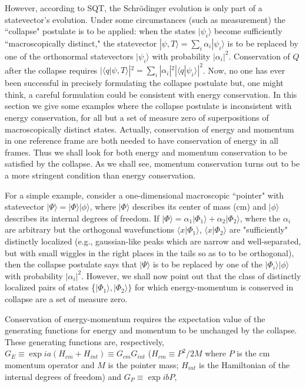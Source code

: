 \documentclass{article}
\begin{document}
	However, according to SQT, the Schr\"odinger evolution is only part of a statevector's evolution.  
Under some circumstances (such as measurement) the ``collapse" postulate is to be applied: when
the states $|\psi_{i}\rangle$ become sufficiently ``macroscopically distinct," 
the statevector $|\psi,T\rangle=\sum_{i}\alpha_{i}|\psi_{i}\rangle$ is to be 
replaced by one of the orthonormal statevectors $|\psi_{i}\rangle$ with probability $|\alpha_{i}|^{2}$. 
Conservation of $Q$ after the collapse requires 
$|\langle q|\psi,T\rangle|^{2}=\sum_{i}|\alpha_{i}|^{2}|\langle q|\psi_{i}\rangle|^{2}$.  
Now, no one has ever been successful
 in precisely formulating the collapse postulate but, one 
might think, a careful formulation could be consistent with energy conservation.  In this section 
we give some examples where the collapse postulate is inconsistent with energy conservation, for all but a 
set of measure zero of superpositions of macroscopically distinct states. 
Actually, conservation of energy and momentum in one reference frame are both needed to have conservation 
of energy in all frames. Thus we shall look for both energy and momentum conservation 
to be satisfied by the collapse.  As we shall see, momentum conservation turns out to be 
a more stringent condition than energy conservation.  

	For a simple example, consider a 
one-dimensional macroscopic ``pointer" with statevector $|\Psi\rangle=|\Phi\rangle|\phi\rangle$, where 
$|\Phi\rangle$ describes its center of mass (cm) and $|\phi\rangle$ describes its internal degrees of freedom.
If $|\Phi\rangle=\alpha_{1}|\Phi_{1}\rangle +\alpha_{2}|\Phi_{2}\rangle$, where the $\alpha_{i}$ are arbitrary 
but the orthogonal wavefunctions $\langle x |\Phi_{1}\rangle$, $\langle x |\Phi_{2}\rangle$ are "sufficiently" 
distinctly localized (e.g., gaussian-like peaks which are narrow and well-separated, 
but with small wiggles in the right places in the tails so as to to be orthogonal), then the collapse postulate says that 
$|\Psi\rangle$ is to be replaced by one of the $|\Phi_{i}\rangle|\phi\rangle$ with probability $|\alpha_{i}|^{2}$. 
However, we shall now point out that the class of distinctly localized pairs of states 
\{$|\Phi_{1}\rangle,|\Phi_{2}\rangle \}$ 
for which energy-momentum is conserved in collapse are a set of measure zero.  

	  Conservation of energy-momentum requires 
the expectation value of the generating functions for energy and momentum to be unchanged by the collapse.
These generating functions are, respectively, $G_{E}\equiv\exp ia(H_{cm}+H_{int})\equiv G_{cm}G_{int}$  
($H_{cm}\equiv P^{2}/2M$ where $P$ is the cm momentum operator and $M$ is the pointer mass; $H_{int}$ is the 
Hamiltonian of the internal degrees of freedom) and $G_{P}\equiv\exp ibP$, 
 
\end{document}
